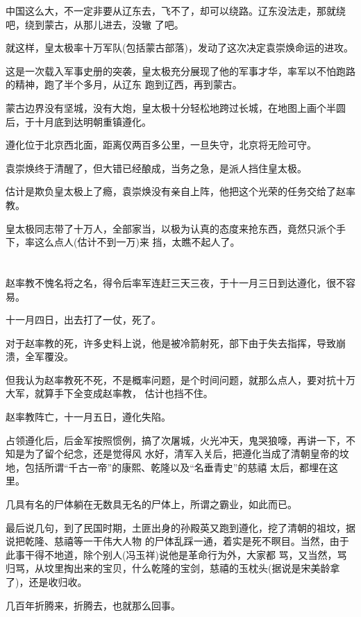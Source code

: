 \documentclass[11pt,a4paper,onecolumn]{article}
\begin{document}
中国这么大，不一定非要从辽东去，飞不了，却可以绕路。辽东没法走，那就绕吧，绕到蒙古，从那儿进去，没辙
了吧。

就这样，皇太极率十万军队(包括蒙古部落)，发动了这次决定袁崇焕命运的进攻。

这是一次载入军事史册的突袭，皇太极充分展现了他的军事才华，率军以不怕跑路的精神，跑了半个多月，从辽东
跑到辽西，再到蒙古。

蒙古边界没有坚城，没有大炮，皇太极十分轻松地跨过长城，在地图上画个半圆后，于十月底到达明朝重镇遵化。

遵化位于北京西北面，距离仅两百多公里，一旦失守，北京将无险可守。

袁崇焕终于清醒了，但大错已经酿成，当务之急，是派人挡住皇太极。

估计是欺负皇太极上了瘾，袁崇焕没有亲自上阵，他把这个光荣的任务交给了赵率教。

皇太极同志带了十万人，全部家当，以极为认真的态度来抢东西，竟然只派个手下，率这么点人(估计不到一万)来
挡，太瞧不起人了。

\section[\thesection]{}

赵率教不愧名将之名，得令后率军连赶三天三夜，于十一月三日到达遵化，很不容易。

十一月四日，出去打了一仗，死了。

对于赵率教的死，许多史料上说，他是被冷箭射死，部下由于失去指挥，导致崩溃，全军覆没。

但我认为赵率教死不死，不是概率问题，是个时间问题，就那么点人，要对抗十万大军，就算手下全变成赵率教，
估计也挡不住。

赵率教阵亡，十一月五日，遵化失陷。

占领遵化后，后金军按照惯例，搞了次屠城，火光冲天，鬼哭狼嚎，再讲一下，不知是为了留个纪念，还是觉得风
水好，清军入关后，把遵化当成了清朝皇帝的坟地，包括所谓``千古一帝''的康熙、乾隆以及``名垂青史''的慈禧
太后，都埋在这里。

几具有名的尸体躺在无数具无名的尸体上，所谓之霸业，如此而已。

最后说几句，到了民国时期，土匪出身的孙殿英又跑到遵化，挖了清朝的祖坟，据说把乾隆、慈禧等一干伟大人物
的尸体乱踩一通，着实是死不瞑目。当然，由于此事干得不地道，除个别人(冯玉祥)说他是革命行为外，大家都
骂，又当然，骂归骂，从坟里掏出来的宝贝，什么乾隆的宝剑，慈禧的玉枕头(据说是宋美龄拿了)，还是收归收。

几百年折腾来，折腾去，也就那么回事。
\end{document}
